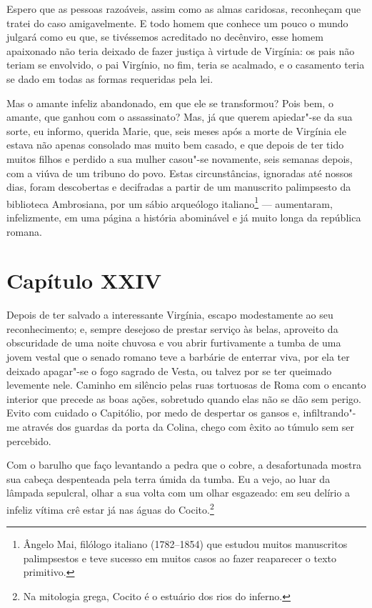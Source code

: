  Espero que as pessoas razoáveis, assim como as almas caridosas,
reconheçam que tratei do caso amigavelmente. E todo homem que conhece
um pouco o mundo julgará como eu que, se tivéssemos acreditado no
decênviro, esse homem apaixonado não teria deixado de fazer justiça à
virtude de Virgínia: os pais não teriam se envolvido, o pai Virgínio,
no fim, teria se acalmado, e o casamento teria se dado em todas as
formas requeridas pela lei.

 Mas o amante infeliz abandonado, em que ele se transformou? Pois bem, o
amante, que ganhou com o assassinato? Mas, já que querem apiedar"-se da
sua sorte, eu informo, querida Marie, que, seis meses após a morte de
Virgínia ele estava não apenas consolado mas muito bem casado, e que
depois de ter tido muitos filhos e perdido a sua mulher casou"-se
novamente, seis semanas depois, com a viúva de um tribuno do povo.
Estas circunstâncias, ignoradas até nossos dias, foram descobertas e
decifradas a partir de um manuscrito palimpsesto da biblioteca
Ambrosiana, por um sábio arqueólogo italiano\footnote{ Ângelo Mai,
filólogo italiano (1782--1854) que estudou muitos manuscritos
palimpsestos e teve sucesso em muitos casos ao fazer reaparecer o texto
primitivo.} --- aumentaram, infelizmente, em uma página a história
abominável e já muito longa da república romana. 

\section*{Capítulo XXIV}

 Depois de ter salvado a interessante Virgínia, escapo modestamente ao
seu reconhecimento; e, sempre desejoso de prestar serviço às belas,
aproveito da obscuridade de uma noite chuvosa e vou abrir furtivamente
a tumba de uma jovem vestal que o senado romano teve a barbárie de
enterrar viva, por ela ter deixado apagar"-se o fogo sagrado de Vesta,
ou talvez por se ter queimado levemente nele. Caminho em silêncio pelas
ruas tortuosas de Roma com o encanto interior que precede as boas
ações, sobretudo quando elas não se dão sem perigo. Evito com cuidado o
Capitólio, por medo de despertar os gansos e, infiltrando"-me através
dos guardas da porta da Colina, chego com êxito ao túmulo sem ser
percebido.

 Com o barulho que faço levantando a pedra que o cobre, a desafortunada
mostra sua cabeça despenteada pela terra úmida da tumba. Eu a vejo, ao
luar da lâmpada sepulcral, olhar a sua volta com um olhar esgazeado: em
seu delírio a infeliz vítima crê estar já nas águas do Cocito.\footnote{ Na 
mitologia grega, Cocito é o estuário dos rios do inferno.}

